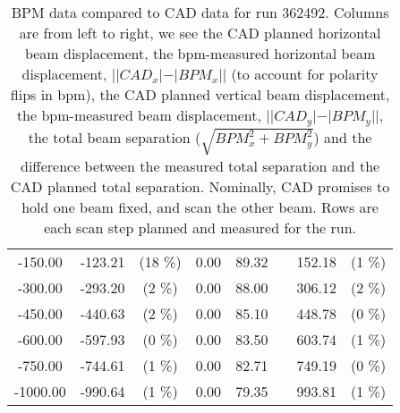 \begin{table}
\begin{tabular}{c c c c c c c c}
-150.00 & -123.21 &  (18 \%) & 0.00 & 89.32 &  & 152.18 &  (1 \%)\\
-300.00 & -293.20 &  (2 \%) & 0.00 & 88.00 &  & 306.12 &  (2 \%)\\
-450.00 & -440.63 &  (2 \%) & 0.00 & 85.10 &  & 448.78 &  (0 \%)\\
-600.00 & -597.93 &  (0 \%) & 0.00 & 83.50 &  & 603.74 &  (1 \%)\\
-750.00 & -744.61 &  (1 \%) & 0.00 & 82.71 &  & 749.19 &  (0 \%)\\
-1000.00 & -990.64 &  (1 \%) & 0.00 & 79.35 &  & 993.81 &  (1 \%)\\
\bottomrule
\end{tabular}
\caption{ BPM data compared to CAD data for run 362492. Columns are from left to right, we see the CAD planned horizontal beam displacement, the bpm-measured horizontal beam displacement, $||CAD_{x}| - |BPM_{x}||$ (to account for polarity flips in bpm), the CAD planned vertical beam displacement, the bpm-measured beam displacement, $||CAD_{y}| - |BPM_{y}||$, the total beam separation ($\sqrt{BPM_{x}^2+BPM_{y}^2}$) and the difference between the measured total separation and the CAD planned total separation. Nominally, CAD promises to hold one beam fixed, and scan the other beam. Rows are each scan step planned and measured for the run. }
\end{table}

